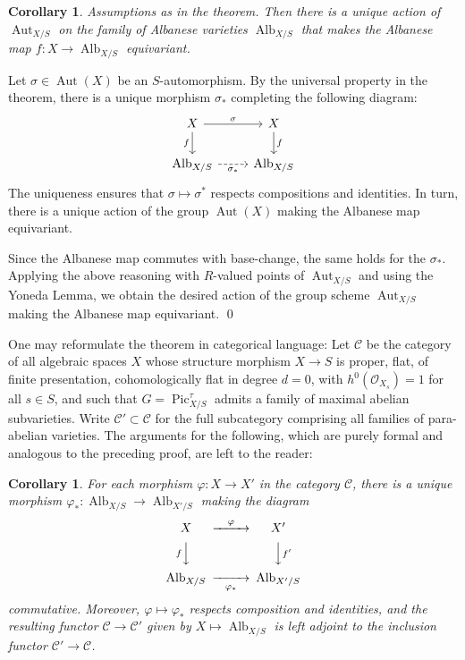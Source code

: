 \documentclass[oneside, 12pt]{amsart}
\newcommand\mylabel[1]{\label{#1}\marginpar{\raggedright\vspace{-1ex}\medskip\medskip\footnotesize \tt #1}}
\renewcommand\mylabel[1]{\label{#1}}
\newtheorem{corollary}[theorem]{Corollary}
\theoremstyle{definition}
\theoremstyle{remark}
\newcommand{\catC}{\mathcal{C}}
\newcommand{\Alb}{\operatorname{Alb}}
\newcommand{\Aut}{\operatorname{Aut}}
\renewcommand{\O}{\mathscr{O}}
\newcommand{\Pic}{\operatorname{Pic}}
\newcommand{\ra}{\rightarrow}
\begin{document}
\begin{corollary}
\mylabel{albanese equivariant}
Assumptions as in the theorem. Then there is a unique action of  $\Aut_{X/S}$
on the family of Albanese varieties $\Alb_{X/S}$ that makes the Albanese map $f:X\ra\Alb_{X/S}$ equivariant.
\end{corollary}

\proof
Let $\sigma\in\Aut(X)$ be an $S$-automorphism. By the universal property in the theorem, there
is a unique morphism $\sigma_*$ completing the following diagram:
$$
\begin{tikzcd} 
X\ar[r,"\sigma"]\ar[d,"f"']     	     &   X\ar[d,"f"]\\
\Alb_{X/S}\ar[r,dashed,"\sigma_*"']       &   \Alb_{X/S}
\end{tikzcd}
$$
The uniqueness ensures that $\sigma\mapsto\sigma^*$ respects compositions and identities.
In turn,  there is a unique action of the group $\Aut(X)$ making the Albanese map equivariant.

Since the Albanese map commutes with base-change, the same holds for the $\sigma_*$.
Applying the above reasoning with $R$-valued points of $\Aut_{X/S}$ and using the Yoneda Lemma,
we obtain the desired action of the group scheme $\Aut_{X/S}$ making the Albanese map equivariant.
\qed

\medskip
One may reformulate the   theorem in categorical language: Let $\catC$ be the category of all 
algebraic spaces $X$ whose structure morphism $X\ra S$ is proper, flat, of finite presentation,
cohomologically flat in degree $d=0$, with $h^0(\O_{X_s})=1$ for all $s\in S$,
and such that $G=\Pic^\tau_{X/S}$ admits a family of maximal abelian subvarieties.
Write $\catC'\subset \catC$ for the full subcategory comprising all families of para-abelian varieties.
The arguments for the following, which are purely formal and analogous to the preceding proof, are left to the reader:

\begin{corollary}
\mylabel{albanese functorial}
For each morphism $\varphi:X\ra X'$ in the category $\catC$, there is a unique morphism $\varphi_*:\Alb_{X/S}\ra \Alb_{X'/S}$
making the diagram
$$
\begin{CD}
X@>\varphi>> X'\\
@VfVV    @VVf'V\\
\Alb_{X/S}  @>>\varphi_*>    \Alb_{X'/S}
\end{CD}
$$
commutative. Moreover, $\varphi\mapsto\varphi_*$ respects composition and identities, 
and the resulting functor $\catC\ra \catC'$ given by $X\mapsto\Alb_{X/S}$ 
is left adjoint to the inclusion functor $\catC'\ra\catC$.
\end{corollary}
\end{document}
